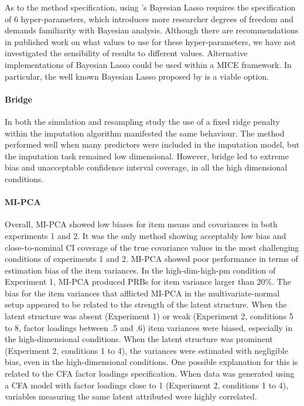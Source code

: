 	As to the method specification, using \cite{hans:2010}'s Bayesian Lasso requires the specification of 6 
	hyper-parameters, which introduces more researcher degrees of freedom and demands familiarity with 
	Bayesian analysis.
	Although there are recommendations in published work on what values to use for these hyper-parameters,
	we have not investigated the sensibility of results to different values.
	Alternative implementations of Bayesian Lasso could be used within a MICE framework.
	In particular, the well known Bayesian Lasso proposed by \cite{parkCasella:2008} is a viable option.

\paragraph{Bridge}
	In both the simulation and resampling study the use of a fixed ridge penalty within the imputation
	algorithm manifested the same behaviour.
	The method performed well when many predictors were included in the imputation model, but the imputation
	task remained low dimensional.
	However, bridge led to extreme bias and unacceptable confidence interval coverage, in all the high 
	dimensional conditions.

\paragraph{MI-PCA}
	Overall, MI-PCA showed low biases for item means and covariances in both experiments 1 and 2.
	It was the only method showing acceptably low bias and close-to-nominal CI coverage of the true
	covariance values in the most challenging conditions of experiments 1 and 2.
	MI-PCA showed poor performance in terms of estimation bias of the item variances.
	In the high-dim-high-pm condition of Experiment 1, MI-PCA produced PRBs for item variance larger than 20\%.
	The bias for the item variances that afflicted MI-PCA in the multivariate-normal setup appeared to be related to 
	the strength of the latent structure.
	When the latent structure was absent (Experiment 1) or weak (Experiment 2, conditions 5 to 8, factor loadings 
	between .5 and .6) item variances were biased, especially in the high-dimensional conditions.
	When the latent structure was prominent (Experiment 2, conditions 1 to 4), the variances were estimated with 
	negligible bias, even in the high-dimensional conditions.
	One possible explanation for this is related to the CFA factor loadings specification. 
	When data was generated using a CFA model with factor loadings close to 1 (Experiment 2, conditions 1 to 4), variables 
	measuring the same latent attributed were highly correlated.

